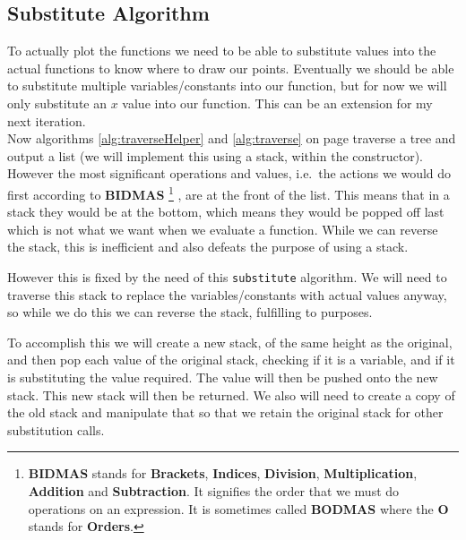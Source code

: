 \documentclass[../../../../../main.tex]{subfiles}
\begin{document}
\subsection{Substitute Algorithm}
To actually plot the functions we need to be able to substitute values into the actual functions to know where to draw our points. Eventually we should be able to substitute multiple variables/constants into our function, but for now we will only substitute an $x$ value into our function. This can be an extension for my next iteration.\\
Now algorithms \ref{alg:traverseHelper} and \ref{alg:traverse} on page \pageref{alg:traverseHelper} traverse a tree and output a list (we will implement this using a stack, within the constructor). However the most significant operations and values, i.e.\ the actions we would do first according to \textbf{BIDMAS}
\footnote{\textbf{BIDMAS} stands for \textbf{Brackets}, \textbf{Indices}, \textbf{Division}, \textbf{Multiplication}, \textbf{Addition} and \textbf{Subtraction}. It signifies the order that we must do operations on an expression. It is sometimes called \textbf{BODMAS} where the \textbf{O} stands for \textbf{Orders}.}
, are at the front of the list. This means that in a stack they would be at the bottom, which means they would be popped off last which is not what we want when we evaluate a function. While we can reverse the stack, this is inefficient and also defeats the purpose of using a stack.

However this is fixed by the need of this \texttt{substitute} algorithm. We will need to traverse this stack to replace the variables/constants with actual values anyway, so while we do this we can reverse the stack, fulfilling to purposes.

To accomplish this we will create a new stack, of the same height as the original, and then pop each value of the original stack, checking if it is a variable, and if it is substituting the value required. The value will then be pushed onto the new stack. This new stack will then be returned. We also will need to create a copy of the old stack and manipulate that so that we retain the original stack for other substitution calls.
\end{document}
